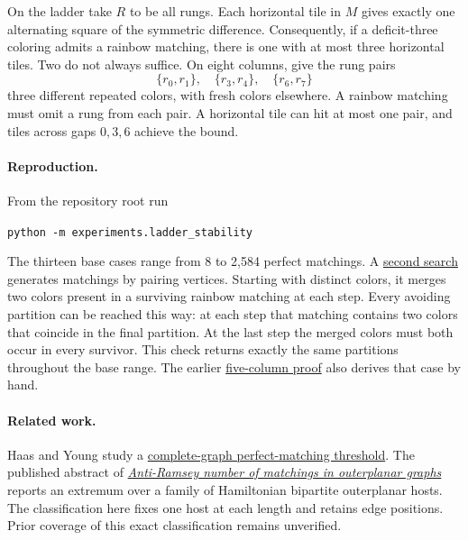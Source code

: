 \documentclass[11pt]{article}
\newcommand{\repo}{https://github.com/Akhil-rav/discrete-math-lab}
\begin{document}
On the ladder take \(R\) to be all rungs. Each horizontal tile in \(M\)
gives exactly one alternating square of the symmetric difference.
Consequently, if a deficit-three coloring admits a rainbow matching,
there is one with at most three horizontal tiles. Two do not always
suffice. On eight columns, give the rung pairs
\[
 \{r_0,r_1\},\quad \{r_3,r_4\},\quad \{r_6,r_7\}
\]
three different repeated colors, with fresh colors elsewhere. A rainbow
matching must omit a rung from each pair. A horizontal tile can hit at
most one pair, and tiles across gaps \(0,3,6\) achieve the bound.

\paragraph{Reproduction.}
From the repository root run
\begin{center}\texttt{python -m experiments.ladder\_stability}\end{center}
The thirteen base cases range from 8 to 2,584 perfect matchings.
A \href{\repo/blob/main/tests/test_ladder_stability.py}{second search}
generates matchings by pairing vertices. Starting with distinct colors, it
merges two colors present in a surviving rainbow matching at each step.
Every avoiding partition can be reached this way: at each step that
matching contains two colors that coincide in the final partition. At the
last step the merged colors must both occur in every survivor. This check
returns exactly the same partitions throughout the base range.
The earlier \href{\repo/blob/main/notes/l5_extremizers.md}{five-column proof}
also derives that case by hand.

\paragraph{Related work.}
Haas and Young study a
\href{https://doi.org/10.1016/j.disc.2011.10.017}{complete-graph perfect-matching threshold}.
The published abstract of
\href{https://doi.org/10.1016/j.dam.2023.11.049}{\emph{Anti-Ramsey number of matchings in outerplanar graphs}}
reports an extremum over a family of Hamiltonian bipartite outerplanar hosts.
The classification here fixes one host at each length and retains edge
positions. Prior coverage of this exact classification remains unverified.
\end{document}
